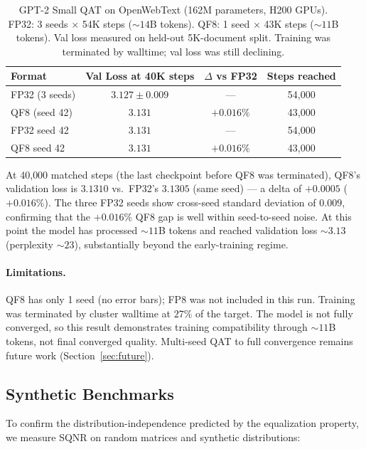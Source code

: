 \documentclass[11pt,letterpaper]{article}
\theoremstyle{definition}
\theoremstyle{remark}
\begin{document}
\begin{table}[ht]
\centering
\caption{GPT-2 Small QAT on OpenWebText (162M parameters, H200 GPUs).
  FP32: 3 seeds $\times$ 54K steps (${\sim}14$B tokens).
  QF8: 1 seed $\times$ 43K steps (${\sim}11$B tokens).
  Val loss measured on held-out 5K-document split.
  Training was terminated by walltime; val loss was still declining.}
\label{tab:qat}
\begin{tabular}{@{}lccc@{}}
\toprule
Format & Val Loss at 40K steps & $\Delta$ vs FP32 & Steps reached \\
\midrule
FP32 (3 seeds)  & $3.127 \pm 0.009$ & ---         & 54{,}000 \\
QF8 (seed 42)   & $3.131$           & $+0.016\%$  & 43{,}000 \\
\midrule
FP32 seed 42    & $3.131$           & ---         & 54{,}000 \\
QF8 seed 42     & $3.131$           & $+0.016\%$  & 43{,}000 \\
\bottomrule
\end{tabular}
\end{table}

At 40{,}000 matched steps (the last checkpoint before QF8 was terminated),
QF8's validation loss is $3.1310$ vs.\ FP32's $3.1305$ (same seed) ---
a delta of $+0.0005$ ($+0.016\%$).
The three FP32 seeds show cross-seed standard deviation of $0.009$,
confirming that the $+0.016\%$ QF8 gap is well within seed-to-seed noise.
At this point the model has processed ${\sim}11$B tokens and reached validation
loss ${\sim}3.13$ (perplexity ${\sim}23$), substantially beyond the
early-training regime.

\paragraph{Limitations.}
QF8 has only 1 seed (no error bars); FP8 was not included in this run.
Training was terminated by cluster walltime at $27\%$ of the target.
The model is not fully converged, so this result demonstrates training
compatibility through ${\sim}11$B tokens, not final converged quality.
Multi-seed QAT to full convergence remains future work
(Section~\ref{sec:future}).

\subsection{Synthetic Benchmarks}
\label{subsec:synthetic}

To confirm the distribution-independence predicted by the equalization property,
we measure SQNR on random matrices and synthetic distributions:
\end{document}
